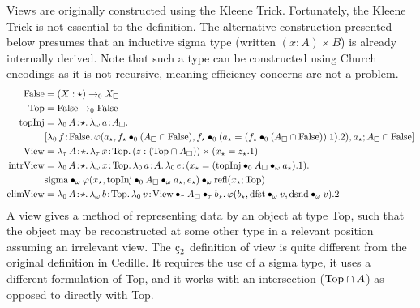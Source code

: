 Views are originally constructed using the Kleene Trick.
Fortunately, the Kleene Trick is not essential to the definition.
The alternative construction presented below presumes that an inductive sigma type (written $(x : A) \times B$) is already internally derived.
Note that such a type can be constructed using Church encodings as it is not recursive, meaning efficiency concerns are not a problem.
\begin{align*}
    \pFalse &= (X:\star) \to_0 X_\square \\
    \pTop &= \pFalse \to_0 \pFalse \\
    \ptopInj &= \abs{\lambda_0}{A}{\star}{
        \abs{\lambda_\omega}{a}{A_\square}{
            \\ &[
                \abs{\lambda_0}{f}{\pFalse}{
                    \varphi(a_\star,
                        \app{f_\star}{0}{(A_\square \cap \pFalse)},
                        \app{f_\star}{0}{(a_\star = (\app{f_\star}{0}{(A_\square \cap \pFalse)}).1 )}.2 )
                },
                a_\star;
                A_\square \cap \pFalse
            ]
        }
    } \\
    \pView &= \abs{\lambda_\tau}{A}{\star}{
        \abs{\lambda_\tau}{x}{\pTop}{
            (z : (\pTop \cap A_\square)) \times (x_\star = z_\star.1)
        }
    } \\
    \pintrView &= \abs{\lambda_0}{A}{\star}{
        \abs{\lambda_\omega}{x}{\pTop}{
            \abs{\lambda_0}{a}{A}{
                \abs{\lambda_0}{e}{(x_\star = (\apptwo{\ptopInj}{0}{A_\square}{\omega}{a_\star}).1)}{
                    \\ &\apptwo{\psigma}
                        {\omega}{\varphi(x_\star, \apptwo{\ptopInj}{0}{A_\square}{\omega}{a_\star}, e_\star)}
                        {\omega}{\prefl(x_\star; \pTop)}
                }
            }
        }
    } \\
    \pelimView &= \abs{\lambda_0}{A}{\star}{
        \abs{\lambda_\omega}{b}{\pTop}{
            \abs{\lambda_0}{v}{\apptwo{\pView}{\tau}{A_\square}{\tau}{b_\star}}{
                \varphi(b_\star, \app{\pdfst}{\omega}{v}, \app{\pdsnd}{\omega}{v}).2
            }
        }
    }
\end{align*}
A view gives a method of representing data by an object at type Top, such that the object may be reconstructed at some other type in a relevant position assuming an irrelevant view.
The $\ced$ definition of view is quite different from the original definition in Cedille.
It requires the use of a sigma type, it uses a different formulation of Top, and it works with an intersection ($\textnormal{Top} \cap A$) as opposed to directly with Top.
